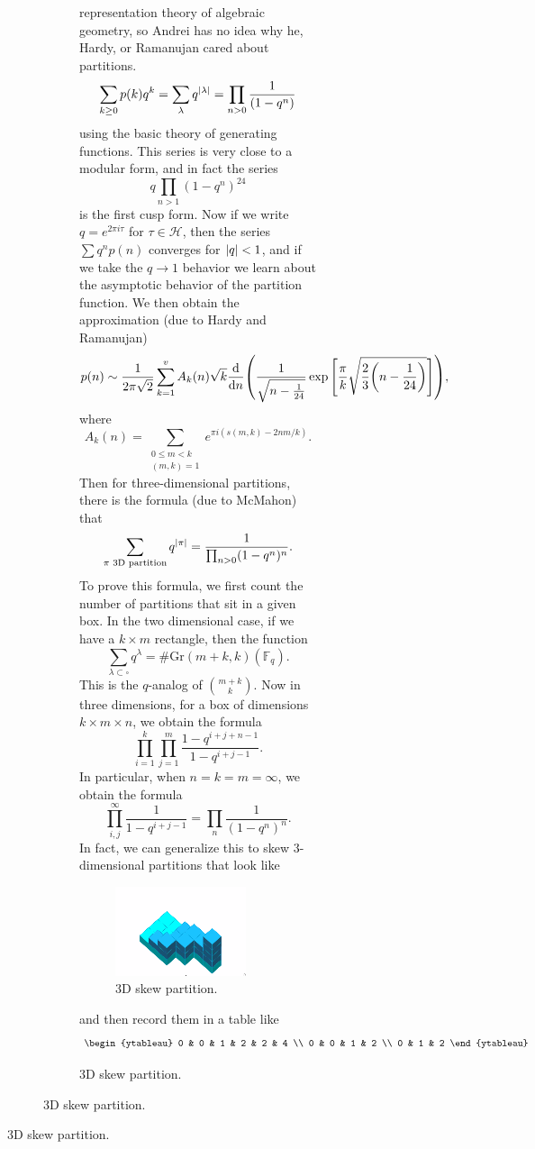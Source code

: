 \documentclass[leqno, openany]{memoir}
\theoremstyle{definition}
\theoremstyle{remark}
\theoremstyle{plain}
\theoremstyle{definition}
\theoremstyle{remark}
\newcommand{\F}{\mathbb{F}}
\newcommand{\mc}[1]{\mathcal{#1}}
\newcommand{\mr}[1]{\mathrm{#1}}
\begin{document}
\begin{figure}[H]
\begin{figure}[H]
\begin{figure}[H]
{representation theory of algebraic geometry, so Andrei has no idea why he,
Hardy, or Ramanujan cared about partitions.} \[ \sum_{k\geq 0} p(k) q^k =
\sum_{\lambda} q^{\abs{\lambda}} = \prod_{n>0} \dfrac{1}{(1-q^n)} \] using the
basic theory of generating functions. This series is very close to a modular
form, and in fact the series \[ q \prod_{n > 1} (1-q^n)^{24} \] is the first
cusp form. Now if we write $q = e^{2 \pi i \tau}$ for $\tau \in \mc{H}$, then
the series $\sum q^n p(n)$ converges for $\abs{q} < 1$, and if we take the $q
\to 1$ behavior we learn about the asymptotic behavior of the partition
function. We then obtain the approximation (due to Hardy and Ramanujan) \[ p(n)
\sim \frac{1}{2 \pi \sqrt{2}} \sum_{k=1}^v A_k(n) \sqrt{k} \dv{n}
\qty(\frac{1}{\sqrt{n - \frac{1}{24}}} \exp \qty[ \frac{\pi}{k}
\sqrt{\frac{2}{3} \qty(n - \frac{1}{24})} ]), \] where \[ A_k(n) =
\sum_{\substack{0 \leq m < k \\ (m,k) = 1}} e^{\pi i (s(m,k) - 2 n m / k)}. \]
Then for three-dimensional partitions, there is the formula (due to McMahon)
that \[ \sum_{\pi \text{ $3$D partition}} q^{\abs{\pi}} = \frac{1}{\prod_{n >
0} (1-q^n)^n}. \] To prove this formula, we first count the number of
partitions that sit in a given box. In the two dimensional case, if we have a
$k \times m$ rectangle, then the function \[ \sum_{\lambda \subset \square}
q^{\lambda} = \#\mr{Gr}(m+k, k)(\F_q). \] This is the $q$-analog of
$\binom{m+k}{k}$. Now in three dimensions, for a box of dimensions $k \times m
\times n$, we obtain the formula \[ \prod_{i=1}^k \prod_{j=1}^m \frac{1 -
q^{i+j+n-1}}{1-q^{i+j-1}}. \] In particular, when $n = k = m = \infty$, we
obtain the formula \[ \prod_{i,j}^{\infty} \frac{1}{1-q^{i+j-1}} = \prod_{n}
\frac{1}{(1-q^n)^n}. \] In fact, we can generalize this to skew $3$-dimensional
partitions that look like \begin{figure}[H] \centering
    \includegraphics[scale=1]{3dskew.png} \caption{$3$D skew partition.}%
    \label{fig:3dskew} \end{figure} and then record them in a table like \[
    \begin{ytableau} 0 & 0 & 1 & 2 & 2 & 4 \\ 0 & 0 & 1 & 2 \\ 0 & 1 & 2

\end{ytableau}\]
\end{figure}
\end{figure}
\end{figure}
\end{document}
